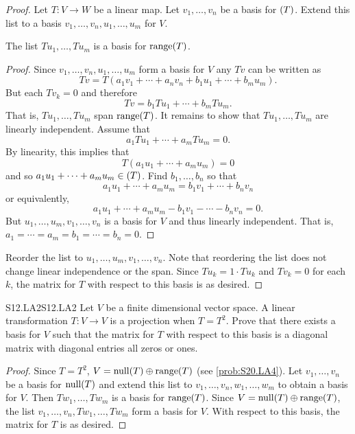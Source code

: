 \documentclass[../../AlgebraQualSolutions.tex]{subfiles}
\begin{document}
	\begin{proof}
		Let $T: V \to W$ be a linear map. Let $v_1,\ldots, v_n$ be a basis for $\null(T)$. Extend this list to a basis $v_1,\ldots, v_n,u_1,\ldots,u_m$ for $V$.

		\begin{claim}
			The list $Tu_1,\ldots, Tu_m$ is a basis for $\mathrm{range}(T)$.

			\begin{proof}
				Since $v_1,\ldots, v_n,u_1,\ldots, u_m$ form a basis for $V$ any $Tv$ can be written as 
					\[Tv = T(a_1v_1 + \cdots + a_nv_n + b_1u_1 + \cdots + b_mu_m).\]
				But each $Tv_k = 0$ and therefore
					\[Tv = b_1Tu_1 + \cdots + b_mTu_m.\]
				That is, $Tu_1,\ldots, Tu_m$ span $\mathrm{range}(T)$. It remains to show that $Tu_1,\ldots, Tu_m$ are linearly independent. Assume that 
					\[a_1Tu_1 + \cdots + a_mTu_m = 0.\]
				By linearity, this implies that
					\[T(a_1u_1 + \cdots + a_mu_m) = 0\]
				and so $a_1u_1 + \cdots + a_mu_m \in \null(T)$. Find $b_1,\ldots, b_n$ so that
					\[a_1u_1 + \cdots + a_mu_m = b_1v_1 + \cdots + b_nv_n\]
				or equivalently,
				\[a_1u_1 + \cdots + a_mu_m - b_1v_1 - \cdots - b_nv_n = 0.\]
				But $u_1,\ldots,u_m,v_1,\ldots,v_n$ is a basis for $V$ and thus linearly independent. That is, $a_1 = \cdots = a_m = b_1 = \cdots = b_n = 0$.
			\end{proof}
		\end{claim}

		Reorder the list to $u_1,\ldots,u_m,v_1,\ldots, v_n$. Note that reordering the list does not change linear independence or the span. Since $Tu_k = 1\cdot Tu_k$ and $Tv_k = 0$ for each $k$, the matrix for $T$ with respect to this basis is as desired.
	\end{proof}

	\begin{prob}{S12.LA2}{S12.LA2}
		Let $V$ be a finite dimensional vector space. A linear transformation $T: V \to V$ is a projection when $T = T^2$. Prove that there exists a basis for $V$ such that the matrix for $T$ with respect to this basis is a diagonal matrix with diagonal entries all zeros or ones.
	\end{prob}

	\begin{proof}
		Since $T = T^2$, $V = \mathrm{null}(T) \oplus \mathrm{range}(T)$ (see \ref{prob:S20.LA4}). Let $v_1,\ldots, v_n$ be a basis for $\mathrm{null}(T)$ and extend this list to $v_1,\ldots, v_n, w_1,\ldots,w_m$ to obtain a basis for $V$. Then $Tw_1,\ldots, Tw_m$ is a basis for $\mathrm{range}(T)$. Since $V = \mathrm{null}(T) \oplus \mathrm{range}(T)$, the list $v_1,\ldots, v_n, Tw_1,\ldots, Tw_m$ form a basis for $V$. With respect to this basis, the matrix for $T$ is as desired.
	\end{proof}
\end{document}
